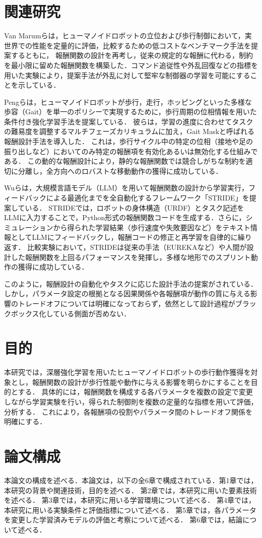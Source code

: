 \section{関連研究}
Van Marumらは，ヒューマノイドロボットの立位および歩行制御において，実世界での性能を定量的に評価，比較するための低コストなベンチマーク手法を提案するともに，
報酬関数の設計を再考し，従来の規定的な報酬に代わる，制約を最小限に留めた報酬関数を構築した．コマンド追従性や外乱回復などの指標を用いた実験により，提案手法が外乱に対して堅牢な制御器の学習を可能にすることを示している．\cite{van2024revisiting}\par
Pengらは，ヒューマノイドロボットが歩行，走行，ホッピングといった多様な歩容（Gait）を単一のポリシーで実現するために，歩行周期の位相情報を用いた条件付き強化学習手法を提案している．
彼らは，学習の進度に合わせてタスクの難易度を調整するマルチフェーズカリキュラムに加え，Gait Maskと呼ばれる報酬設計手法を導入した．
これは，歩行サイクル中の特定の位相（接地や足の振り出しなど）においてのみ特定の報酬項を有効化あるいは無効化する仕組みである．
この動的な報酬設計により，静的な報酬関数では競合しがちな制約を適切に分離し，全方向へのロバストな移動動作の獲得に成功している．\cite{peng2025gait}\par
Wuらは，大規模言語モデル（LLM）を用いて報酬関数の設計から学習実行，フィードバックによる最適化までを全自動化するフレームワーク「STRIDE」を提案している．
STRIDEでは，ロボットの身体構造（URDF）とタスク記述をLLMに入力することで，Python形式の報酬関数コードを生成する．さらに，シミュレーションから得られた学習結果（歩行速度や失敗要因など）をテキスト情報としてLLMにフィードバックし，報酬コードの修正と再学習を自律的に繰り返す．
比較実験において，STRIDEは従来の手法（EUREKAなど）や人間が設計した報酬関数を上回るパフォーマンスを発揮し，多様な地形でのスプリント動作の獲得に成功している．\cite{wu2025stride}\par
このように，報酬設計の自動化やタスクに応じた設計手法の提案がされている．しかし，パラメータ設定の根拠となる因果関係や各報酬項が動作の質に与える影響のトレードオフについては明確になっておらず，依然として設計過程がブラックボックス化している側面が否めない．
\newpage
\section{目的}
本研究では，深層強化学習を用いたヒューマノイドロボットの歩行動作獲得を対象とし，報酬関数の設計が歩行性能や動作に与える影響を明らかにすることを目的とする．
具体的には，報酬関数を構成する各パラメータを複数の設定で変更しながら学習実験を行い，得られた制御則を複数の定量的な指標を用いて評価，分析する．
これにより，各報酬項の役割やパラメータ間のトレードオフ関係を明確にする．

\section{論文構成}
本論文の構成を述べる．本論文は，以下の全6章で構成されている．第1章では，本研究の背景や関連技術，目的を述べる．
第2章では，本研究に用いた要素技術を述べる．
第3章では，本研究に用いる学習環境について述べる．
第4章では，本研究に用いる実験条件と評価指標について述べる．
第5章では，各パラメータを変更した学習済みモデルの評価と考察について述べる．
第6章では，結論について述べる．

\newpage
